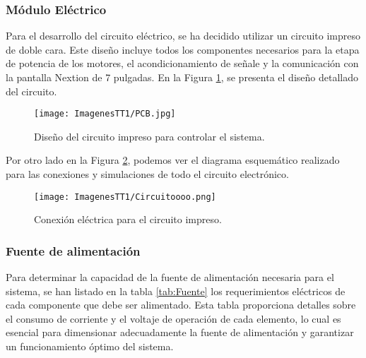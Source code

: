 \documentclass[14pt,oneside]{extarticle} %
\begin{document}
\subsubsection{Módulo Eléctrico}

Para el desarrollo del circuito eléctrico, se ha decidido utilizar un circuito impreso de doble cara. Este diseño incluye todos los componentes necesarios para la etapa de potencia de los motores, el acondicionamiento de señale y la comunicación con la pantalla Nextion de 7 pulgadas. En la Figura \ref{fig:PCB}, se presenta el diseño detallado del circuito.

\begin{figure}[h!]
    \centering
    \texttt{[image: ImagenesTT1/PCB.jpg]}
    \caption{Diseño del circuito impreso para controlar el sistema.}
    \label{fig:PCB}
\end{figure}

Por otro lado en la Figura \ref{fig:Esquematico}, podemos ver el diagrama esquemático realizado para las conexiones y simulaciones de todo el circuito electrónico.

\begin{figure}[h!]
    \centering
    \texttt{[image: ImagenesTT1/Circuitoooo.png]}
    \caption{Conexión eléctrica para el circuito impreso.}
    \label{fig:Esquematico}
\end{figure}

\newpage
\subsubsection{Fuente de alimentación}

Para determinar la capacidad de la fuente de alimentación necesaria para el sistema, se han listado en la tabla \ref{tab:Fuente} los requerimientos eléctricos de cada componente que debe ser alimentado. Esta tabla proporciona detalles sobre el consumo de corriente y el voltaje de operación de cada elemento, lo cual es esencial para dimensionar adecuadamente la fuente de alimentación y garantizar un funcionamiento óptimo del sistema.
\end{document}
